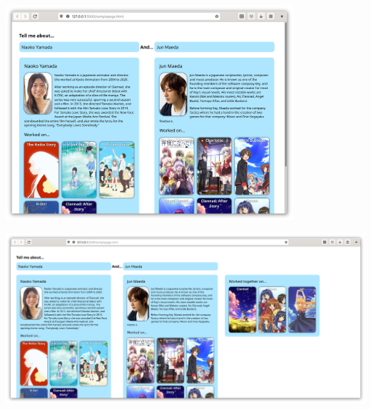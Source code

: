 \documentclass[a4paper]{article}
\begin{document}
\includegraphics[width=0.8\textwidth]{mockups/with maeda.png}

\includegraphics[width=\textwidth]{mockups/workedtogether.png}
\end{document}
